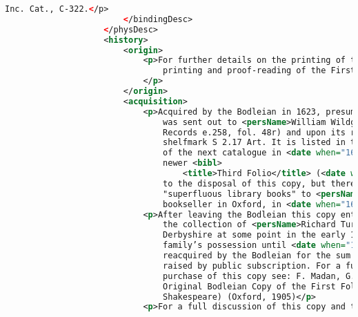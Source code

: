 \documentclass[class=article, crop=false]{standalone}
\begin{document}
\begin{lstlisting}[language=XML]
                                Inc. Cat., C-322.</p>
                        </bindingDesc>
                    </physDesc>
                    <history>
                        <origin>
                            <p>For further details on the printing of this item see Hinman, Charleton. The
                                printing and proof-reading of the First Folio of Shakespeare: Oxford, 1963.
                            </p>
                        </origin>
                        <acquisition>
                            <p>Acquired by the Bodleian in 1623, presumably in sheets. It
                                was sent out to <persName>William Wildgoose</persName> on <date when="1624-02-17">17 February 1624</date> for binding (see: Library
                                Records e.258, fol. 48r) and upon its return chained in Duke Humfrey at
                                shelfmark S 2.17 Art. It is listed in the Bodleian’s <date when="1635">1635</date> catalogue of printed books but was gone by the publication
                                of the next catalogue in <date when="1674">1674</date>, replaced by the
                                newer <bibl>
                                    <title>Third Folio</title> (<date when="1664">1664</date>)</bibl>. There is no explicit reference in Library Records
                                to the disposal of this copy, but there is a record of a sale of
                                "superfluous library books" to <persName>Richard Davis</persName>, a
                                bookseller in Oxford, in <date when="1664">1664</date> for the sum of <num value="24">£24</num>.</p>
                            <p>After leaving the Bodleian this copy entered
                                the collection of <persName>Richard Turbutt</persName> of Ogston Hall,
                                Derbyshire at some point in the early 18th century. It stayed in the
                                family’s possession until <date when="1906">1906</date>, when it was
                                reacquired by the Bodleian for the sum of <num value="3000">£3000</num>,
                                raised by public subscription. For a full discussion of the rediscovery and
                                purchase of this copy see: F. Madan, G. M. R. Turbutt and S. Gibson, The
                                Original Bodleian Copy of the First Folio of Shakespeare (theTurbutt
                                Shakespeare) (Oxford, 1905)</p>
                            <p>For a full discussion of this copy and the

\end{lstlisting}
\end{document}
